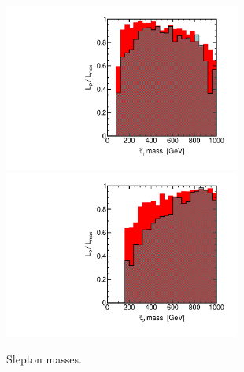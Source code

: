 \begin{figure}[htbp]
\begin{center}
\includegraphics[height=5.5cm]{figs/fig_tau_1.pdf} 
\includegraphics[height=5.5cm]{figs/fig_tau_2.pdf}
\caption{Slepton masses.}
\label{default}
\end{center}
\end{figure}


